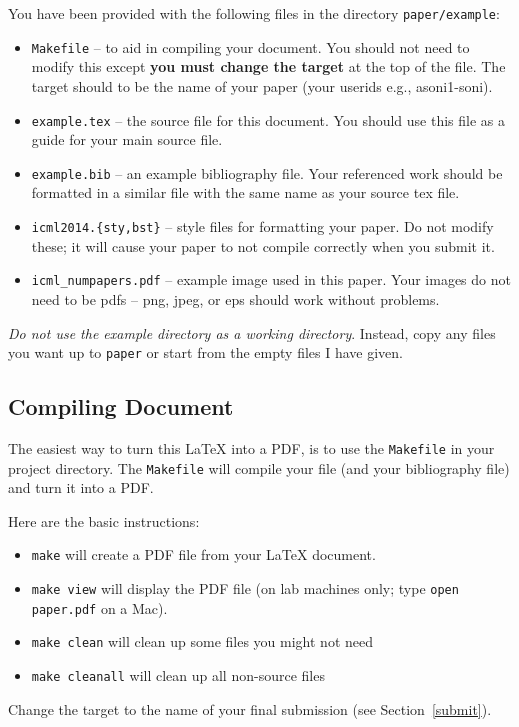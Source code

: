 \documentclass{article}
\begin{document}
You have been provided with the following files in the directory {\tt paper/example}:
\begin{itemize}
  \item {\tt Makefile} -- to aid in compiling your document.  You should
    not need to modify this except {\bf you must change the target} at the top
    of the file.  The target should to be
    the name of your paper (your userids e.g., asoni1-soni).
  \item {\tt example.tex} -- the source file for this document.
    You should use this file as a guide for your main source file.
  \item {\tt example.bib} -- an example bibliography file.
    Your referenced work should be formatted in a similar file with the same
    name as your source tex file.
  \item {\tt icml2014.\{sty,bst\}} -- style files for formatting your paper.
    Do not modify these; it will cause your paper to not compile correctly when
    you submit it.
  \item {\tt icml\_numpapers.pdf} -- example image used in this paper.
    Your images do not need to be pdfs -- png, jpeg, or eps should work without problems.
\end{itemize}
{\em Do not use the example directory as a working directory}.  Instead, copy
any files you want up to {\tt paper} or start from the empty files I have given.

\subsection{Compiling Document}
The easiest way to turn this \LaTeX{} into a PDF, is to use the
{\tt Makefile} in your project directory. The {\tt Makefile} will
compile your file (and your bibliography file) and turn it into a PDF.

Here are the basic instructions:
\begin{itemize}
\item {\tt make} will create a PDF file from your \LaTeX{} document.
\item {\tt make view} will display the PDF file (on lab machines only; type
  {\tt open paper.pdf} on a Mac).
\item {\tt make clean} will clean up some files you might not need
\item {\tt make cleanall} will clean up all non-source files
\end{itemize}

Change the target to the name of your final submission (see Section~\ref{submit}).
\end{document}
